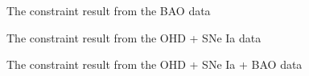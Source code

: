 \documentclass[twocolumn]{aastex631}
\begin{document}
   \begin{figure}[htbp]
      \centering
      \caption{The constraint result from the BAO data}
   \end{figure}

   \begin{figure}[htbp]
      \centering
      \caption{The constraint result from the OHD + SNe Ia data}
   \end{figure}

   \begin{figure}[htbp]
      \centering
      \caption{The constraint result from the OHD + SNe Ia + BAO data}
   \end{figure}
\end{document}
